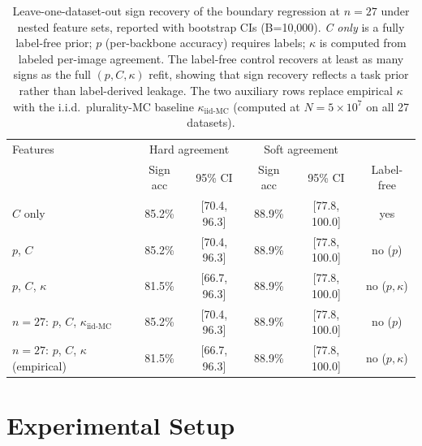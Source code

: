 \documentclass[a4paper,fleqn]{cas-sc}
\begin{document}
\begin{table}[t]
\centering
\caption{Leave-one-dataset-out sign recovery of the boundary regression at $n{=}27$ under nested feature sets, reported with bootstrap CIs (B=10,000). \emph{C only} is a fully label-free prior; $p$ (per-backbone accuracy) requires labels; $\kappa$ is computed from labeled per-image agreement. The label-free control recovers at least as many signs as the full $(p,C,\kappa)$ refit, showing that sign recovery reflects a task prior rather than label-derived leakage. The two auxiliary rows replace empirical $\kappa$ with the i.i.d.\ plurality-MC baseline $\kappa_{\text{iid-MC}}$ (computed at $N{=}5\times 10^7$ on all 27 datasets).}
\label{tab:loocv_control}
\small
\begin{tabular}{lccccc}
\toprule
Features & \multicolumn{2}{c}{Hard agreement} & \multicolumn{2}{c}{Soft agreement} & \\
 & Sign acc & 95\% CI & Sign acc & 95\% CI & Label-free \\
\midrule
$C$ only              & 85.2\% & [70.4, 96.3] & 88.9\% & [77.8, 100.0] & yes \\
$p$, $C$              & 85.2\% & [70.4, 96.3] & 88.9\% & [77.8, 100.0] & no ($p$) \\
$p$, $C$, $\kappa$    & 81.5\% & [66.7, 96.3] & 88.9\% & [77.8, 100.0] & no ($p,\kappa$) \\
\midrule
$n{=}27$: $p$, $C$, $\kappa_{\text{iid-MC}}$ & 85.2\% & [70.4, 96.3] & 88.9\% & [77.8, 100.0] & no ($p$) \\
$n{=}27$: $p$, $C$, $\kappa$ (empirical)     & 81.5\% & [66.7, 96.3] & 88.9\% & [77.8, 100.0] & no ($p,\kappa$) \\
\bottomrule
\end{tabular}
\end{table}

\section{Experimental Setup}
\label{sec:setup}
\end{document}
